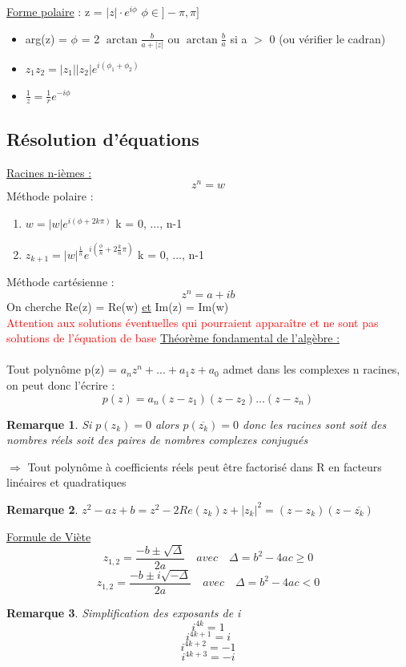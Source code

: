 \documentclass{article}
\newtheorem{remark}{Remarque}[section]
\begin{document}
\underline{Forme polaire} : z = \( |z|\cdot e^{i\phi} \) \qquad \qquad \qquad \( \phi \in ]-\pi, \pi]\)
\begin{itemize}
    \item arg(z) = \(\phi\) = 2 \( \arctan{\frac{b}{a + |z|}} \) ou \( \arctan{\frac{b}{a}}\) si a $>$ 0 (ou vérifier le cadran)
    \item \( z_1z_2 = |z_1||z_2|e^{i(\phi_1 + \phi_2)} \)
    \item \( \frac{1}{z} = \frac{1}{r}e^{-i\phi} \)
\end{itemize}
\subsection{Résolution d'équations}
\underline{Racines n-ièmes :}
\[ z^n = w\]
Méthode polaire :
\begin{enumerate}
    \item \( w = |w|e^{i(\phi + 2k\pi)} \) \qquad \qquad \qquad k = 0, ..., n-1
    \item \( z_{k+1} = |w|^{\frac{1}{n}}e^{i(\frac{\phi}{n} + 2\frac{k}{n}\pi)} \) \qquad \qquad \qquad k = 0, ..., n-1
\end{enumerate}
Méthode cartésienne :
\[ z^n = a + ib \]
On cherche Re(z) = Re(w) \underline{et} Im(z) = Im(w) \\
\textcolor{red}{Attention aux solutions éventuelles qui pourraient apparaître et ne sont pas solutions de l'équation de base}
\newpage
\underline{Théorème fondamental de l'algèbre :} \\\\
Tout polynôme p(z) = \( a_nz^n+...+a_1z +a_0 \) admet dans les complexes n racines, on peut donc l'écrire :
\[ p(z) = a_n(z - z_1)(z - z_2)...(z - z_n)\]
\begin{remark}
    Si \(p(z_k) = 0\) alors \(p(\overline{z_k}) = 0\) donc les racines sont soit des nombres réels soit des paires de nombres complexes conjugués
\end{remark}
\(\Rightarrow\) Tout polynôme à coefficients réels peut être factorisé dans R en facteurs linéaires et quadratiques
\begin{remark}
    \( z^2 - az + b = z^2 - 2Re(z_k)z + |z_k|^2 = (z - z_k)(z - \overline{z_k})\)
\end{remark}
\underline{Formule de Viète}
\[ z_{1,2} = \frac{-b \pm \sqrt{\Delta}}{2a} \quad avec \quad \Delta = b^2 - 4ac \geq 0\]
\[ z_{1,2} = \frac{-b \pm i\sqrt{-\Delta}}{2a} \quad avec \quad \Delta = b^2 - 4ac < 0\]

\begin{remark}
Simplification des exposants de i
    \[ i^{4k} = 1 \]
    \[ i^{4k+1} = i \]
    \[ i^{4k+2} = -1 \] 
    \[ i^{4k+3} = -i \]
\end{remark}
\end{document}
